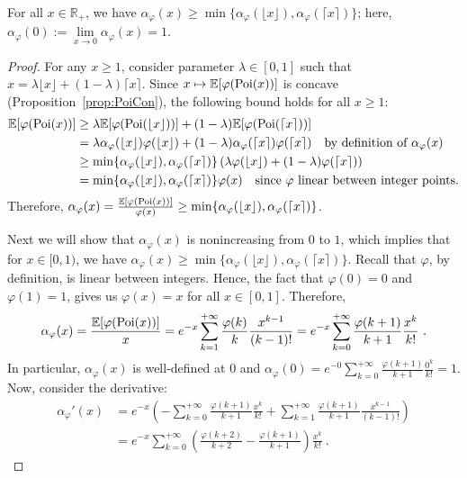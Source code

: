 \begin{proposition}
For all $x \in \mathbb{R}_+$, we have $\alpha_{\varphi}(x) \geq \min\{\alpha_{\varphi}(\lfloor x \rfloor), \alpha_{\varphi}(\lceil x \rceil)\}$; here, $\alpha_{\varphi}(0) := \underset{x \rightarrow 0}{\lim} \alpha_{\varphi}(x) = 1$.
  \label{prop:minInt}
\end{proposition}
\begin{proof}
For any $x \geq 1$, consider parameter $\lambda \in [0,1]$ such that $x = \lambda \lfloor x \rfloor + (1-\lambda) \lceil x \rceil$. Since $x \mapsto \mathbb{E}[\varphi(\operatorname{\text{Poi}}(x))]$ is concave (Proposition~\ref{prop:PoiCon}), the following bound holds for all $x \geq 1$:
  \begin{align*}
      \mathbb{E}[\varphi(\operatorname{\text{Poi}}(x))] &\geq \lambda \mathbb{E}[\varphi(\operatorname{\text{Poi}}(\lfloor x \rfloor))] + (1-\lambda) \mathbb{E}[\varphi(\operatorname{\text{Poi}}(\lceil x \rceil))] \\      
      &=  \lambda \alpha_{\varphi}(\lfloor x \rfloor)\varphi(\lfloor x \rfloor) + (1-\lambda) \alpha_{\varphi}(\lceil x \rceil)\varphi(\lceil x \rceil) \quad \text{by definition of $\alpha_{\varphi}(x)$}\\
      &\geq \min\{\alpha_{\varphi}(\lfloor x \rfloor), \alpha_{\varphi}(\lceil x \rceil)\} \left(\lambda \varphi(\lfloor x \rfloor) + (1-\lambda) \varphi(\lceil x \rceil) \right)\\
      &=  \min\{\alpha_{\varphi}(\lfloor x \rfloor), \alpha_{\varphi}(\lceil x \rceil)\} \varphi(x) \quad \text{since $\varphi$ linear between integer points.} 
  \end{align*}
Therefore, $\alpha_{\varphi}(x) = \frac{\mathbb{E}[\varphi(\operatorname{\text{Poi}}(x))]}{\varphi(x)} \geq \min\{\alpha_{\varphi}(\lfloor x \rfloor), \alpha_{\varphi}(\lceil x \rceil)\}$.


Next we will show that $\alpha_{\varphi}(x)$ is nonincreasing from $0$ to $1$, which implies that for $x \in [0,1)$, we have $\alpha_{\varphi}(x) \geq  \min\{\alpha_{\varphi}(\lfloor x \rfloor), \alpha_{\varphi}(\lceil x \rceil)\}$.
Recall that $\varphi$, by definition, is linear between integers. Hence, the fact that $\varphi(0) = 0$ and $\varphi(1) = 1$, gives us $\varphi(x) = x$ for all $x \in [0,1]$. Therefore, 
  \[\alpha_{\varphi}(x) = \frac{\mathbb{E}[\varphi(\Poi(x))]}{x} = e^{-x}\sum_{k=1}^{+\infty}\frac{\varphi(k)}{k}\frac{x^{k-1}}{(k-1)!} = e^{-x}\sum_{k=0}^{+\infty}\frac{\varphi(k+1)}{k+1}\frac{x^k}{k!} \ . \]
  In particular, $\alpha_{\varphi}(x)$ is well-defined at $0$ and $\alpha_{\varphi}(0) = e^{-0}\sum_{k=0}^{+\infty}\frac{\varphi(k+1)}{k+1}\frac{0^k}{k!} = 1$. Now, consider the derivative:
  \begin{equation}
    \begin{aligned}
    \alpha_{\varphi}'(x) &= e^{-x}\left(-\sum_{k=0}^{+\infty}\frac{\varphi(k+1)}{k+1}\frac{x^k}{k!} + \sum_{k=1}^{+\infty}\frac{\varphi(k+1)}{k+1}\frac{x^{k-1}}{(k-1)!} \right)\\
    &= e^{-x}\sum_{k=0}^{+\infty}\left(\frac{\varphi(k+2)}{k+2} - \frac{\varphi(k+1)}{k+1} \right)\frac{x^k}{k!} \ .
    \end{aligned}
  \end{equation}


\end{proof}
